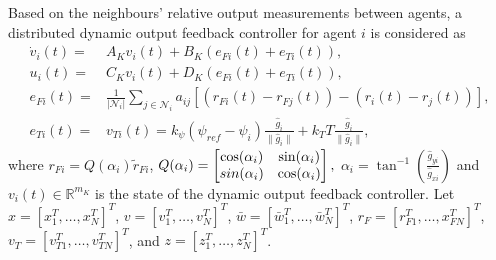 Based on the neighbours' relative output measurements between agents, a distributed dynamic output feedback controller  for agent $i$ is considered as
\begin{align}\label{eq:lct_LTIcontroller}
\dot{v}_i(t)  =& A_K v_i(t) +B_K (e_{Fi}(t) + e_{Ti}(t)),\nonumber\\ 
u_i(t) = & C_K v_i(t) +D_K(e_{Fi}(t) +e_{Ti}(t)), \nonumber \\
e_{Fi}(t) =& \frac{1}{\left| \mathcal{N}_i \right|}\sum_{j \in \mathcal{N}_i} a_{ij} \left[ (r_{Fi}(t)-r_{Fj}(t)) -(r_i(t)-r_j(t))  \right], \nonumber \\
e_{Ti}(t) =& v_{Ti}(t)=k_{\psi}(\psi_{ref}-\psi_i)\frac{\hat{g}_i}{\|\hat{g}_i\|}+ k_T T \frac{\hat{g}_i}{\|\hat{g}_i\|},
\end{align}
where
$r_{Fi}=Q(\alpha _i)\tilde{r}_{Fi}$, 
$
Q(\alpha_i)=
\begin{bmatrix}
\cos(\alpha_i) & \sin(\alpha_i)\\
\-sin(\alpha_i) &  \cos(\alpha_i)
\end{bmatrix},
$
$\alpha_i= \tan^{-1}\left(\frac{\hat{g}_{yi}}{\hat{g}_{xi}}\right)$ and 
$v_i(t) \in \mathbb{R}^{m_K}$ is the state of the dynamic output feedback controller.  %
Let 
$x=[x_1^T, \ldots,  x_N^T]^T$, 
$v=[v_1^T, \ldots,  v_N^T]^T$, 
$\bar{w}=[\bar{w}_1^T, \ldots,  \bar{w}_N^T]^T$,
$r_F=[r_{F1}^T, \ldots,  x_{FN}^T]^T$, 
$v_T=[v_{T1}^T, \ldots,  v_{TN}^T]^T$, 
and 
$z=[z_1^T, \ldots, z_N^T]^T$. 

 


